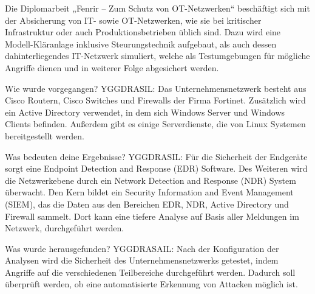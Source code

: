 

Die Diplomarbeit „Fenrir – Zum Schutz von OT-Netzwerken“ beschäftigt sich mit der Absicherung von IT- sowie OT-Netzwerken, wie sie bei kritischer Infrastruktur oder auch Produktionsbetrieben üblich sind. Dazu wird eine Modell-Kläranlage inklusive Steurungstechnik aufgebaut, als auch dessen dahinterliegendes IT-Netzwerk simuliert, welche als Testumgebungen für mögliche Angriffe dienen und in weiterer Folge abgesichert werden.

Wie wurde vorgegangen?
YGGDRASIL: Das Unternehmensnetzwerk besteht aus Cisco Routern, Cisco Switches und Firewalls der Firma Fortinet. Zusätzlich wird ein Active Directory verwendet, in dem sich Windows Server und Windows Clients befinden. Außerdem gibt es einige Serverdienste, die von Linux Systemen bereitgestellt werden.

Was bedeuten deine Ergebnisse?
YGGDRASIL: Für die Sicherheit der Endgeräte sorgt eine Endpoint Detection and Response (EDR) Software. Des Weiteren wird die Netzwerkebene durch ein Network Detection and Response (NDR) System überwacht. Den Kern bildet ein Security Information and Event Management (SIEM), das die Daten aus den Bereichen EDR, NDR, Active Directory und Firewall sammelt. Dort kann eine tiefere Analyse auf Basis aller Meldungen im Netzwerk, durchgeführt werden.

Was wurde herausgefunden?
YGGDRASAIL: Nach der Konfiguration der Analysen wird die Sicherheit des Unternehmensnetzwerks getestet, indem Angriffe auf die verschiedenen Teilbereiche durchgeführt werden. Dadurch soll überprüft werden, ob eine automatisierte Erkennung von Attacken möglich ist.
